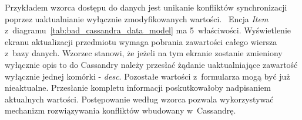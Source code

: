 Przykładem wzorca dostępu do danych jest unikanie konfliktów synchronizacji poprzez uaktualnianie wyłącznie zmodyfikowanych wartości.~\cite{cassandra_concepts_patterns_antipatterns} Encja \emph{Item} z~diagramu~\ref{tab:bad_cassandra_data_model} ma 5~właściwości. Wyświetlenie ekranu aktualizacji przedmiotu wymaga pobrania zawartości całego wiersza z~bazy danych. Wzorzec stanowi, że jeżeli na tym ekranie zostanie zmieniony wyłącznie opis to do Cassandry należy przesłać żądanie uaktualniające zawartość wyłącznie jednej komórki - \emph{desc}. Pozostałe wartości z~formularza mogą być już nieaktualne. Przesłanie kompletu informacji poskutkowałoby nadpisaniem aktualnych wartości. Postępowanie według wzorca pozwala wykorzystywać mechanizm rozwiązywania konfliktów wbudowany w~Cassandrę.

